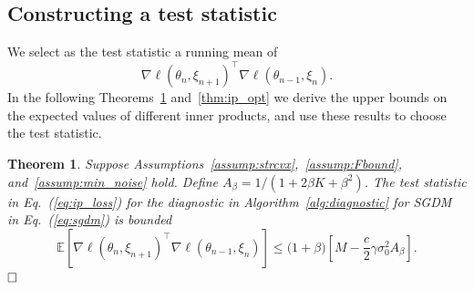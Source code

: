 \documentclass[conference]{IEEEtran}
\newtheorem{theorem}{Theorem}
\begin{document}
\subsection{Constructing a test statistic}

We select as the test statistic a running mean of 
\begin{equation}
\label{eq:ip_loss}
\nabla \ell ( \theta_{n}, \xi_{n+1})^\top \nabla \ell ( \theta_{n-1}, \xi_{n} ).
\end{equation}
In the following Theorems~\ref{thm:ip_exp_bd} and~\ref{thm:ip_opt} we derive the upper bounds on the expected values of different inner products, 
and use these results to choose the test statistic.

\begin{theorem}
\label{thm:ip_exp_bd}
Suppose Assumptions~\ref{assump:strcvx},~\ref{assump:Fbound}, and~\ref{assump:min_noise} hold. 
Define $A_\beta =  1 / (1 + 2 \beta K + \beta^2)$.
The test statistic in Eq.~(\ref{eq:ip_loss}) for the  diagnostic in Algorithm~\ref{alg:diagnostic} for SGDM in Eq.~(\ref{eq:sgdm}) is bounded 
\begin{equation*}
\mathbb{E} [ \nabla \ell ( \theta_n, \xi_{n+1} )^\top \nabla \ell ( \theta_{n-1}, \xi_n ) ] 
\leq \big( 1 + \beta \big) \left[ M - \frac{c}{2} \gamma \sigma_0^2 A_\beta \right].
\end{equation*}$\hfill\Box$
\end{theorem}

\end{document}
